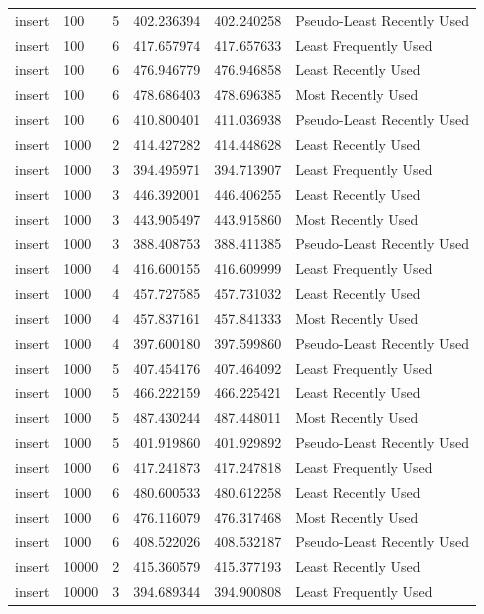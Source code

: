 \begin{tabular}{llrrrl}
insert & 100 & 5 & 402.236394 & 402.240258 & Pseudo-Least Recently Used \\
insert & 100 & 6 & 417.657974 & 417.657633 & Least Frequently Used \\
insert & 100 & 6 & 476.946779 & 476.946858 & Least Recently Used \\
insert & 100 & 6 & 478.686403 & 478.696385 & Most Recently Used \\
insert & 100 & 6 & 410.800401 & 411.036938 & Pseudo-Least Recently Used \\
insert & 1000 & 2 & 414.427282 & 414.448628 & Least Recently Used \\
insert & 1000 & 3 & 394.495971 & 394.713907 & Least Frequently Used \\
insert & 1000 & 3 & 446.392001 & 446.406255 & Least Recently Used \\
insert & 1000 & 3 & 443.905497 & 443.915860 & Most Recently Used \\
insert & 1000 & 3 & 388.408753 & 388.411385 & Pseudo-Least Recently Used \\
insert & 1000 & 4 & 416.600155 & 416.609999 & Least Frequently Used \\
insert & 1000 & 4 & 457.727585 & 457.731032 & Least Recently Used \\
insert & 1000 & 4 & 457.837161 & 457.841333 & Most Recently Used \\
insert & 1000 & 4 & 397.600180 & 397.599860 & Pseudo-Least Recently Used \\
insert & 1000 & 5 & 407.454176 & 407.464092 & Least Frequently Used \\
insert & 1000 & 5 & 466.222159 & 466.225421 & Least Recently Used \\
insert & 1000 & 5 & 487.430244 & 487.448011 & Most Recently Used \\
insert & 1000 & 5 & 401.919860 & 401.929892 & Pseudo-Least Recently Used \\
insert & 1000 & 6 & 417.241873 & 417.247818 & Least Frequently Used \\
insert & 1000 & 6 & 480.600533 & 480.612258 & Least Recently Used \\
insert & 1000 & 6 & 476.116079 & 476.317468 & Most Recently Used \\
insert & 1000 & 6 & 408.522026 & 408.532187 & Pseudo-Least Recently Used \\
insert & 10000 & 2 & 415.360579 & 415.377193 & Least Recently Used \\
insert & 10000 & 3 & 394.689344 & 394.900808 & Least Frequently Used \\

\end{tabular}
